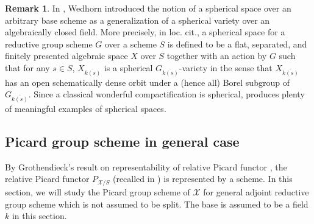 \documentclass[11pt, reqno]{amsart}
\theoremstyle{plain}
\theoremstyle{definition}
\newtheorem{remark}[theorem]{Remark}
\begin{document}
\begin{remark}
    In \cite{Wedhornspherical}, Wedhorn introduced the notion of a spherical space over an arbitrary base scheme as a generalization of a spherical variety over an algebraically closed field. More precisely, in loc. cit., a spherical space for a reductive group scheme $G$ over a scheme $S$ is defined to be a flat, separated, and finitely presented algebraic space $X$ over $S$ together with an action by $G$ such that for any $s\in S$, $X_{\overline{k(s)}}$ is a spherical $G_{\overline{k(s)}}$-variety in the sense that $X_{\overline{k(s)}}$ has an open schematically dense orbit under a (hence all) Borel subgroup of $G_{\overline{k(s)}}$. Since a classical wonderful compactification is spherical,  produces plenty of meaningful examples of spherical spaces. 
\end{remark}



\subsection{Picard group scheme in general case}\label{picardgroupnonsplit}
By Grothendieck's result on representability of relative Picard functor \cite[n°~232, théorème~3.1]{FGA}, the relative Picard functor $P_{\mathcal{X}/S}$ (recalled in ) is represented by a scheme. In this section, we will study the Picard group scheme of $\mathcal{X}$ for general adjoint reductive group scheme which is not assumed to be split. The base is assumed to be a field $k$ in this section. 
\end{document}
